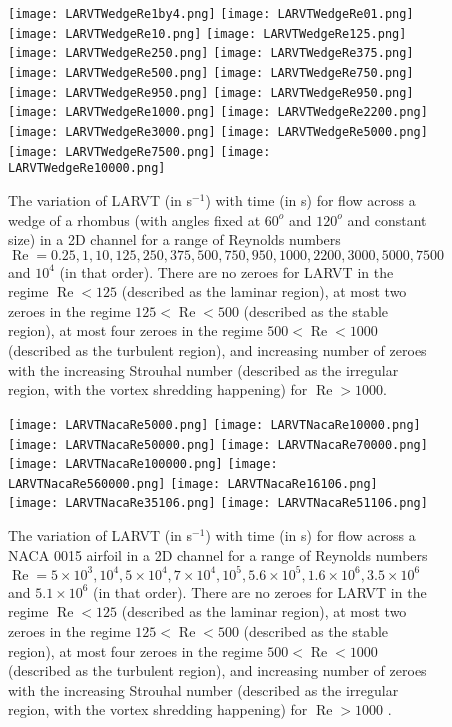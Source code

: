 \documentclass{article}
\begin{document}
\begin{figure}
\texttt{[image: LARVTWedgeRe1by4.png]}
\texttt{[image: LARVTWedgeRe01.png]}
\texttt{[image: LARVTWedgeRe10.png]}
\texttt{[image: LARVTWedgeRe125.png]}
\texttt{[image: LARVTWedgeRe250.png]}
\texttt{[image: LARVTWedgeRe375.png]}
\texttt{[image: LARVTWedgeRe500.png]}
\texttt{[image: LARVTWedgeRe750.png]}
\texttt{[image: LARVTWedgeRe950.png]}
\texttt{[image: LARVTWedgeRe950.png]}
\texttt{[image: LARVTWedgeRe1000.png]}
\texttt{[image: LARVTWedgeRe2200.png]}
\texttt{[image: LARVTWedgeRe3000.png]}
\texttt{[image: LARVTWedgeRe5000.png]}
\texttt{[image: LARVTWedgeRe7500.png]}
\texttt{[image: LARVTWedgeRe10000.png]}
\caption{\label{Fig4} The variation of LARVT (in s$^{-1}$) with time (in s) for flow across a wedge of a rhombus (with angles fixed at $60^{o}$ and $120^{o}$ and constant size) in a 2D channel for a range of Reynolds numbers $\operatorname{Re} = 0.25, 1, 10, 125, 250, 375, 500, 750, 950, 1000, 2200, 3000, 5000, 7500$ and $10^4$ (in that order). There are no zeroes for LARVT in the regime $\operatorname{Re} < 125$ (described as the laminar region), at most two zeroes in the regime $125 < \operatorname{Re} < 500$ (described as the stable region), at most four zeroes in the regime $500 < \operatorname{Re} < 1000$ (described as the turbulent region), and increasing number of zeroes with the increasing Strouhal number (described as the irregular region, with the vortex shredding happening) for $\operatorname{Re} > 1000$.}
\end{figure}
\begin{figure}
\texttt{[image: LARVTNacaRe5000.png]}
\texttt{[image: LARVTNacaRe10000.png]}
\texttt{[image: LARVTNacaRe50000.png]}
\texttt{[image: LARVTNacaRe70000.png]}
\texttt{[image: LARVTNacaRe100000.png]}
\texttt{[image: LARVTNacaRe560000.png]}
\texttt{[image: LARVTNacaRe16106.png]}
\texttt{[image: LARVTNacaRe35106.png]}
\texttt{[image: LARVTNacaRe51106.png]}
\caption{\label{Fig5} The variation of LARVT (in s$^{-1}$) with time (in s) for flow across a NACA 0015 airfoil in a 2D channel for a range of Reynolds numbers $\operatorname{Re} = 5\times10^3, 10^4, 5\times10^4, 7\times 10^4, 10^5, 5.6\times10^5, 1.6\times10^6, 3.5\times10^6$ and $5.1\times10^6$ (in that order). There are no zeroes for LARVT in the regime $\operatorname{Re} < 125$ (described as the laminar region), at most two zeroes in the regime $125 < \operatorname{Re} < 500$ (described as the stable region), at most four zeroes in the regime $500 < \operatorname{Re} < 1000$ (described as the turbulent region), and increasing number of zeroes with the increasing Strouhal number (described as the irregular region, with the vortex shredding happening) for $\operatorname{Re} > 1000$ \cite{naca0015}.}
\end{figure}
\end{document}
